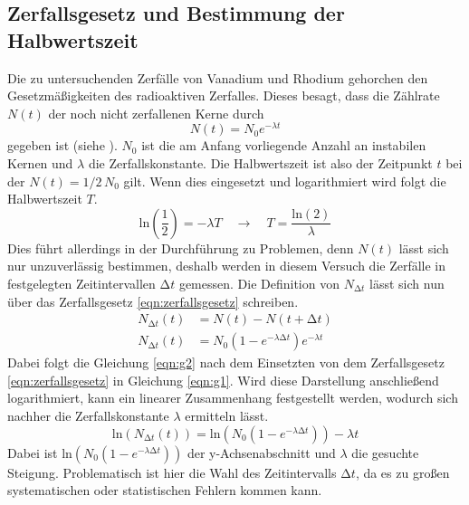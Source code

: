 \subsection{Zerfallsgesetz und Bestimmung der Halbwertszeit}
Die zu untersuchenden Zerfälle von Vanadium und Rhodium gehorchen den Gesetzmäßigkeiten des radioaktiven Zerfalles. Dieses besagt, dass die Zählrate $N(t)$ der noch nicht zerfallenen Kerne durch
\begin{equation}
\label{eqn:zerfallsgesetz}
N(t) = N_{0} e^{-\lambda t}
\end{equation}
gegeben ist (siehe \cite{skript2}). $N_{0}$ ist die am Anfang vorliegende Anzahl an instabilen Kernen und $\lambda$ die Zerfallskonstante.
Die Halbwertszeit ist also der Zeitpunkt $t$ bei der $N(t) = 1/2 \, N_{0}$ gilt.
Wenn dies eingesetzt und logarithmiert wird folgt die Halbwertszeit $T$.
\begin{equation}
\label{eqn:187}
\text{ln}\left( \frac{1}{2}\right) = -\lambda T \quad \to \quad T = \frac{\text{ln}(2)}{\lambda}
\end{equation}
Dies führt allerdings in der Durchführung zu Problemen, denn $N(t)$ lässt sich nur unzuverlässig bestimmen, deshalb werden in diesem Versuch die Zerfälle in
festgelegten Zeitintervallen $\increment t$ gemessen.
Die Definition von $N_{\increment t}$ lässt sich nun über das Zerfallsgesetz \eqref{eqn:zerfallsgesetz} schreiben.
\begin{align}
\label{eqn:g1}
N_{\increment t}(t) &=  N(t) - N(t + \increment t) \\
\label{eqn:g2}
N_{\increment t}(t) &= N_{0} (1-e^{-\lambda \increment t}) e^{-\lambda t}
\end{align}
Dabei folgt die Gleichung \eqref{eqn:g2} nach dem Einsetzten von dem Zerfallsgesetz \eqref{eqn:zerfallsgesetz} in Gleichung \eqref{eqn:g1}.
Wird diese Darstellung anschließend logarithmiert, kann ein linearer Zusammenhang festgestellt werden, wodurch sich nachher die Zerfallskonstante $\lambda$ ermitteln lässt.
\begin{equation}
\label{eqn:brrr}
\text{ln}(N_{\increment t}(t)) = \text{ln}(N_{0}(1-e^{-\lambda \increment t})) - \lambda t
\end{equation}
Dabei ist $\text{ln}(N_{0}(1-e^{-\lambda \increment t}))$ der y-Achsenabschnitt und $\lambda$ die gesuchte Steigung.
Problematisch ist hier die Wahl des Zeitintervalls $\increment t$, da es zu großen systematischen oder statistischen Fehlern kommen kann.

